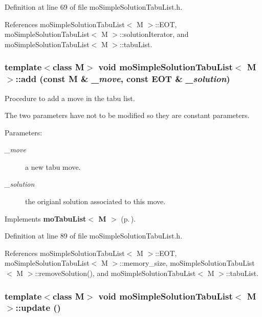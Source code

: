 Definition at line 69 of file mo\-Simple\-Solution\-Tabu\-List.h.

References mo\-Simple\-Solution\-Tabu\-List$<$ M $>$::EOT, mo\-Simple\-Solution\-Tabu\-List$<$ M $>$::solution\-Iterator, and mo\-Simple\-Solution\-Tabu\-List$<$ M $>$::tabu\-List.
\subsubsection{\setlength{\rightskip}{0pt plus 5cm}template$<$class M$>$ void {\bf mo\-Simple\-Solution\-Tabu\-List}$<$ M $>$::add (const M \& {\em \_\-move}, const {\bf EOT} \& {\em \_\-solution})\hspace{0.3cm}{\tt  [inline, virtual]}}\label{classmo_simple_solution_tabu_list_a2}


Procedure to add a move in the tabu list. 

The two parameters have not to be modified so they are constant parameters.

\begin{Desc}
\item[Parameters:]
\begin{description}
\item[{\em \_\-move}]a new tabu move. \item[{\em \_\-solution}]the origianl solution associated to this move. \end{description}
\end{Desc}


Implements {\bf mo\-Tabu\-List$<$ M $>$} {\rm (p.\,\pageref{classmo_tabu_list_a0})}.

Definition at line 89 of file mo\-Simple\-Solution\-Tabu\-List.h.

References mo\-Simple\-Solution\-Tabu\-List$<$ M $>$::EOT, mo\-Simple\-Solution\-Tabu\-List$<$ M $>$::memory\_\-size, mo\-Simple\-Solution\-Tabu\-List$<$ M $>$::remove\-Solution(), and mo\-Simple\-Solution\-Tabu\-List$<$ M $>$::tabu\-List.
\subsubsection{\setlength{\rightskip}{0pt plus 5cm}template$<$class M$>$ void {\bf mo\-Simple\-Solution\-Tabu\-List}$<$ M $>$::update ()\hspace{0.3cm}{\tt  [inline, virtual]}}\label{classmo_simple_solution_tabu_list_a3}


